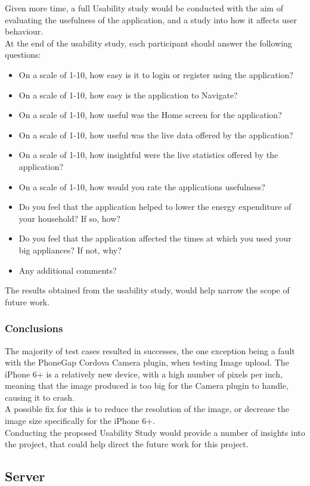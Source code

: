 \documentclass[draft,preprint,12pt,3p]{elsarticle}
\begin{document}
Given more time, a full Usability study would be conducted with the aim of evaluating the usefulness of the application, and a study into how it affects user behaviour.\\
At the end of the usability study, each participant should answer the following questions:
\begin{itemize}
\item On a scale of 1-10, how easy is it to login or register using the application?
\item On a scale of 1-10, how easy is the application to Navigate?
\item On a scale of 1-10, how useful was the Home screen for the application?
\item On a scale of 1-10, how useful was the live data offered by the application?
\item On a scale of 1-10, how insightful were the live statistics offered by the application?
\item On a scale of 1-10, how would you rate the applications usefulness?
\item Do you feel that the application helped to lower the energy expenditure of your household? If so, how?
\item Do you feel that the application affected the times at which you used your big appliances? If not, why?
\item Any additional comments?
\end{itemize}
The results obtained from the usability study, would help narrow the scope of future work.

\subsubsection{Conclusions}
The majority of test cases resulted in successes, the one exception being a fault with the PhoneGap Cordova Camera plugin, when testing Image upload. The iPhone 6+ is a relatively new device, with a high number of pixels per inch, meaning that the image produced is too big for the Camera plugin to handle, causing it to crash.\\
A possible fix for this is to reduce the resolution of the image, or decrease the image size specifically for the iPhone 6+.\\
Conducting the proposed Usability Study would provide a number of insights into the project, that could help direct the future work for this project.

\clearpage
\subsection{Server}
\end{document}
